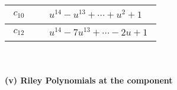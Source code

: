 \documentclass[1p]{elsarticle_modified}
\theoremstyle{definition}
\begin{document}
\begin{tabular}{m{50pt}|m{274pt}}
\hline $$\begin{aligned}c_{10}\end{aligned}$$&$\begin{aligned}
&u^{14}- u^{13}+\cdots+u^2+1
\end{aligned}$\\
\hline $$\begin{aligned}c_{12}\end{aligned}$$&$\begin{aligned}
&u^{14}-7 u^{13}+\cdots-2 u+1
\end{aligned}$\\
\hline
\end{tabular}\\~\\
\newpage\renewcommand{\arraystretch}{1}
\flushleft \textbf{(v) Riley Polynomials at the component}\newline \\
\end{document}
